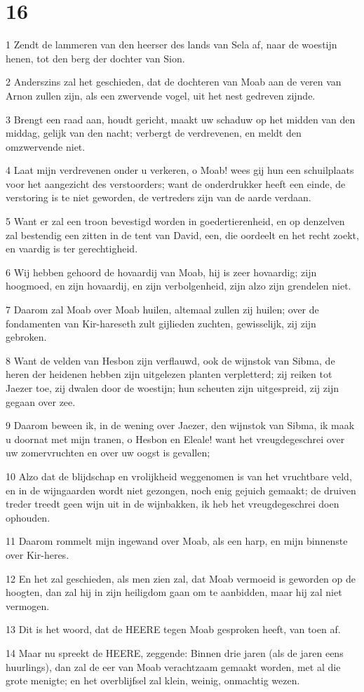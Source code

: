 \chapter{16}

\par 1 Zendt de lammeren van den heerser des lands van Sela af, naar de woestijn henen, tot den berg der dochter van Sion.
\par 2 Anderszins zal het geschieden, dat de dochteren van Moab aan de veren van Arnon zullen zijn, als een zwervende vogel, uit het nest gedreven zijnde.
\par 3 Brengt een raad aan, houdt gericht, maakt uw schaduw op het midden van den middag, gelijk van den nacht; verbergt de verdrevenen, en meldt den omzwervende niet.
\par 4 Laat mijn verdrevenen onder u verkeren, o Moab! wees gij hun een schuilplaats voor het aangezicht des verstoorders; want de onderdrukker heeft een einde, de verstoring is te niet geworden, de vertreders zijn van de aarde verdaan.
\par 5 Want er zal een troon bevestigd worden in goedertierenheid, en op denzelven zal bestendig een zitten in de tent van David, een, die oordeelt en het recht zoekt, en vaardig is ter gerechtigheid.
\par 6 Wij hebben gehoord de hovaardij van Moab, hij is zeer hovaardig; zijn hoogmoed, en zijn hovaardij, en zijn verbolgenheid, zijn alzo zijn grendelen niet.
\par 7 Daarom zal Moab over Moab huilen, altemaal zullen zij huilen; over de fondamenten van Kir-hareseth zult gijlieden zuchten, gewisselijk, zij zijn gebroken.
\par 8 Want de velden van Hesbon zijn verflauwd, ook de wijnstok van Sibma, de heren der heidenen hebben zijn uitgelezen planten verpletterd; zij reiken tot Jaezer toe, zij dwalen door de woestijn; hun scheuten zijn uitgespreid, zij zijn gegaan over zee.
\par 9 Daarom beween ik, in de wening over Jaezer, den wijnstok van Sibma, ik maak u doornat met mijn tranen, o Hesbon en Eleale! want het vreugdegeschrei over uw zomervruchten en over uw oogst is gevallen;
\par 10 Alzo dat de blijdschap en vrolijkheid weggenomen is van het vruchtbare veld, en in de wijngaarden wordt niet gezongen, noch enig gejuich gemaakt; de druiven treder treedt geen wijn uit in de wijnbakken, ik heb het vreugdegeschrei doen ophouden.
\par 11 Daarom rommelt mijn ingewand over Moab, als een harp, en mijn binnenste over Kir-heres.
\par 12 En het zal geschieden, als men zien zal, dat Moab vermoeid is geworden op de hoogten, dan zal hij in zijn heiligdom gaan om te aanbidden, maar hij zal niet vermogen.
\par 13 Dit is het woord, dat de HEERE tegen Moab gesproken heeft, van toen af.
\par 14 Maar nu spreekt de HEERE, zeggende: Binnen drie jaren (als de jaren eens huurlings), dan zal de eer van Moab verachtzaam gemaakt worden, met al die grote menigte; en het overblijfsel zal klein, weinig, onmachtig wezen.

